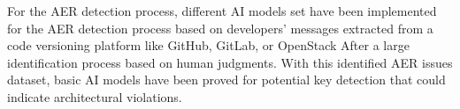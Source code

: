 For the AER detection process, different AI models set have been implemented for the AER detection process based on developers' messages extracted from a code versioning platform like GitHub, GitLab, or OpenStack After a large identification process based on human judgments. With this identified AER issues dataset, basic AI models have been proved for potential key detection that could indicate architectural violations. 





